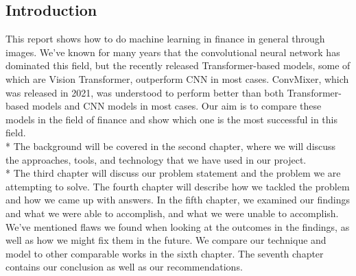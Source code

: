 \documentclass{article}
\begin{document}
\begin{center}
    \section{Introduction}
\end{center}
This report shows how to do machine learning in finance in general through images. We've known for many years that the convolutional neural network has dominated this field, but the recently released Transformer-based models, some of which are Vision Transformer, outperform CNN in most cases. ConvMixer, which was released in 2021, was understood to perform better than both Transformer-based models and CNN models in most cases. Our aim is to compare these models in the field of finance and show which one is the most successful in this field. \vspace{0.2cm} \\*
The background will be covered in the second chapter, where we will discuss the approaches, tools, and technology that we have used in our project. \vspace{0.2cm}\\* 
The third chapter will discuss our problem statement and the problem we are attempting to solve. The fourth chapter will describe how we tackled the problem and how we came up with answers. In the fifth chapter, we examined our findings and what we were able to accomplish, and what we were unable to accomplish. We've mentioned flaws we found when looking at the outcomes in the findings, as well as how we might fix them in the future. We compare our technique and model to other comparable works in the sixth chapter. The seventh chapter contains our conclusion as well as our recommendations.
\end{document}
